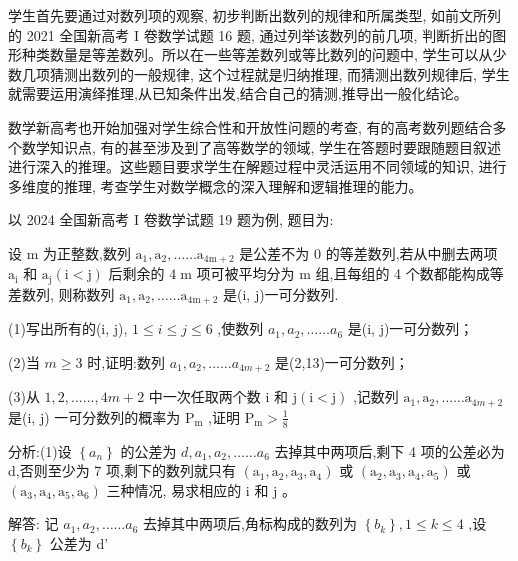 \documentclass[10pt]{article}
\begin{document}
学生首先要通过对数列项的观察, 初步判断出数列的规律和所属类型, 如前文所列的 2021 全国新高考 I 卷数学试题 16 题, 通过列举该数列的前几项, 判断折出的图形种类数量是等差数列。所以在一些等差数列或等比数列的问题中, 学生可以从少数几项猜测出数列的一般规律, 这个过程就是归纳推理, 而猜测出数列规律后, 学生就需要运用演绎推理,从已知条件出发,结合自己的猜测,推导出一般化结论。

数学新高考也开始加强对学生综合性和开放性问题的考查, 有的高考数列题结合多个数学知识点, 有的甚至涉及到了高等数学的领域, 学生在答题时要跟随题目叙述进行深入的推理。这些题目要求学生在解题过程中灵活运用不同领域的知识, 进行多维度的推理, 考查学生对数学概念的深入理解和逻辑推理的能力。

以 2024 全国新高考 I 卷数学试题 19 题为例, 题目为:

设 \(\mathrm{m}\) 为正整数,数列 \({\mathrm{a}}_{1},{\mathrm{a}}_{2},\ldots \ldots {\mathrm{a}}_{4\mathrm{m} + 2}\) 是公差不为 0 的等差数列,若从中删去两项 \({\mathrm{a}}_{\mathrm{i}}\) 和 \({\mathrm{a}}_{\mathrm{j}}\left( {\mathrm{i} < \mathrm{j}}\right)\) 后剩余的 \(4\mathrm{\;m}\) 项可被平均分为 \(\mathrm{m}\) 组,且每组的 4 个数都能构成等差数列, 则称数列 \({\mathrm{a}}_{1},{\mathrm{a}}_{2},\ldots \ldots {\mathrm{a}}_{4\mathrm{m} + 2}\) 是(i, j)一可分数列.

(1)写出所有的(i, j), \(1 \leq  i \leq  j \leq  6\) ,使数列 \({a}_{1},{a}_{2},\ldots \ldots {a}_{6}\) 是(i, j)一可分数列；

(2)当 \(m \geq  3\) 时,证明:数列 \({a}_{1},{a}_{2},\ldots \ldots {a}_{{4m} + 2}\) 是(2,13)一可分数列；

(3)从 \(1,2,\ldots \ldots ,{4m} + 2\) 中一次任取两个数 \(\mathrm{i}\) 和 \(\mathrm{j}\left( {\mathrm{i} < \mathrm{j}}\right)\) ,记数列 \({\mathrm{a}}_{1},{\mathrm{a}}_{2},\ldots \ldots {\mathrm{a}}_{{4m} + 2}\) 是(i, j) 一可分数列的概率为 \({\mathrm{P}}_{\mathrm{m}}\) ,证明 \({\mathrm{P}}_{\mathrm{m}} > \frac{1}{8}\)

分析:(1)设 \(\left\{  {a}_{n}\right\}\) 的公差为 \(d,{a}_{1},{a}_{2},\ldots \ldots {a}_{6}\) 去掉其中两项后,剩下 4 项的公差必为 d,否则至少为 7 项,剩下的数列就只有 \(\left( {{\mathrm{a}}_{1},{\mathrm{a}}_{2},{\mathrm{a}}_{3},{\mathrm{a}}_{4}}\right)\) 或 \(\left( {{\mathrm{a}}_{2},{\mathrm{a}}_{3},{\mathrm{a}}_{4},{\mathrm{a}}_{5}}\right)\) 或 \(\left( {{\mathrm{a}}_{3},{\mathrm{a}}_{4},{\mathrm{a}}_{5},{\mathrm{a}}_{6}}\right)\) 三种情况, 易求相应的 \(\mathrm{i}\) 和 \(\mathrm{j}\) 。

解答: 记 \({a}_{1},{a}_{2},\ldots \ldots {a}_{6}\) 去掉其中两项后,角标构成的数列为 \(\left\{  {b}_{k}\right\}  ,1 \leq  k \leq  4\) ,设 \(\left\{  {b}_{k}\right\}\) 公差为 d'
\end{document}
